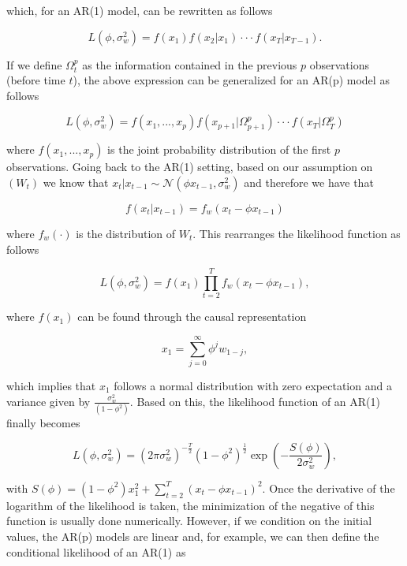 \documentclass[]{book}
\theoremstyle{definition}
\theoremstyle{definition}
\theoremstyle{definition}
\theoremstyle{remark}
\begin{document}
which, for an AR(1) model, can be rewritten as follows

\begin{equation*}
L(\phi,\sigma_w^2) = f(x_1)f(x_2|x_1)\cdot \cdot \cdot f(x_T|x_{T-1}).
\end{equation*}

If we define \(\Omega_t^p\) as the information contained in the previous
\(p\) observations (before time \(t\)), the above expression can be
generalized for an AR(p) model as follows

\begin{equation*}
L(\phi,\sigma_w^2) = f(x_1,...,x_p)f(x_{p+1}|\Omega_{p+1}^p)\cdot \cdot \cdot f(x_T|\Omega_{T}^p)
\end{equation*}

where \(f(x_1,...,x_p)\) is the joint probability distribution of the
first \(p\) observations. Going back to the AR(1) setting, based on our
assumption on \((W_t)\) we know that
\(x_t|x_{t-1} \sim \mathcal{N}(\phi x_{t-1},\sigma_w^2)\) and therefore
we have that

\begin{equation*}
f(x_t|x_{t-1}) = f_w(x_t - \phi x_{t-1})
\end{equation*}

where \(f_w(\cdot)\) is the distribution of \(W_t\). This rearranges the
likelihood function as follows

\begin{equation*}
L(\phi,\sigma_w^2) = f(x_1)\prod_{t=2}^T f_w(x_t - \phi x_{t-1}),
\end{equation*}

where \(f(x_1)\) can be found through the causal representation

\begin{equation*}
x_1 = \sum_{j=0}^{\infty} \phi^j w_{1-j},
\end{equation*}

which implies that \(x_1\) follows a normal distribution with zero
expectation and a variance given by \(\frac{\sigma_w^2}{(1-\phi^2)}\).
Based on this, the likelihood function of an AR(1) finally becomes

\begin{equation*}
L(\phi,\sigma_w^2) = (2\pi \sigma_w^2)^{-\frac{T}{2}} (1 - \phi^2)^{\frac{1}{2}} \exp \left(-\frac{S(\phi)}{2 \sigma_w^2}\right),
\end{equation*}

with
\(S(\phi) = (1-\phi^2) x_1^2 + \sum_{t=2}^T (x_t -\phi x_{t-1})^2\).
Once the derivative of the logarithm of the likelihood is taken, the
minimization of the negative of this function is usually done
numerically. However, if we condition on the initial values, the AR(p)
models are linear and, for example, we can then define the conditional
likelihood of an AR(1) as
\end{document}
